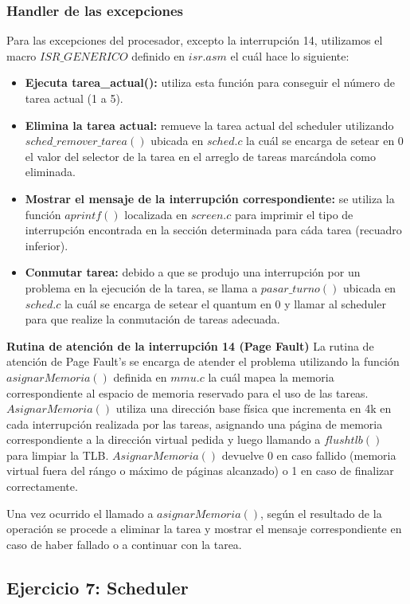 \documentclass[a4paper,10pt,twoside]{article}
\begin{document}
\subsubsection{Handler de las excepciones}
Para las excepciones del procesador, excepto la interrupción 14, utilizamos el macro $ISR\_GENERICO$ definido en $isr.asm$ el cuál hace lo siguiente:
\begin{itemize}
\item \textbf{Ejecuta tarea\_actual():} utiliza esta función para conseguir el número de tarea actual (1 a 5).
\item \textbf{Elimina la tarea actual:} remueve la tarea actual del scheduler utilizando $sched\_remover\_tarea()$ ubicada en $sched.c$ la cuál se encarga de setear en 0 el valor del selector de la tarea en el arreglo de tareas marcándola como eliminada.
\item \textbf{Mostrar el mensaje de la interrupción correspondiente:} se utiliza la función $aprintf()$ localizada en $screen.c$ para imprimir el tipo de interrupción encontrada en la sección determinada para cáda tarea (recuadro inferior).
\item \textbf{Conmutar tarea:} debido a que se produjo una interrupción por un problema en la ejecución de la tarea, se llama a $pasar\_turno()$ ubicada en $sched.c$ la cuál se encarga de setear el quantum en 0 y llamar al scheduler para que realize la conmutación de tareas adecuada.
\end{itemize}

\textbf{Rutina de atención de la interrupción 14 (Page Fault)}
La rutina de atención de Page Fault's se encarga de atender el problema utilizando la función $asignarMemoria()$ definida en $mmu.c$ la cuál mapea la memoria correspondiente al espacio de memoria reservado para el uso de las tareas. $AsignarMemoria()$ utiliza una dirección base física que incrementa en 4k en cada interrupción realizada por las tareas, asignando una página de memoria correspondiente a la dirección virtual pedida y luego llamando a $flushtlb()$ para limpiar la TLB. $AsignarMemoria()$ devuelve 0 en caso fallido (memoria virtual fuera del rángo o máximo de páginas alcanzado) o 1 en caso de finalizar correctamente.

Una vez ocurrido el llamado a $asignarMemoria()$, según el resultado de la operación se procede a eliminar la tarea y mostrar el mensaje correspondiente en caso de haber fallado o a continuar con la tarea.



\subsection{Ejercicio 7: Scheduler}
\end{document}
